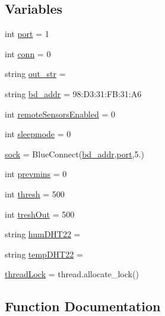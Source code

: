 \subsection*{Variables}
\begin{DoxyCompactItemize}
\item 
int \hyperlink{namespaceSensorNode0_a98a0834cf9ffb42aadb98db46f82cac4}{port} = 1
\item 
int \hyperlink{namespaceSensorNode0_aa58109ec652b3ad7ee90acb844a55e0f}{conn} = 0
\item 
string \hyperlink{namespaceSensorNode0_acbfb5ad644195e6858adb96b932aa531}{out\+\_\+str} = \textquotesingle{}\textquotesingle{}
\item 
string \hyperlink{namespaceSensorNode0_a6bda8d693f223a3426dcc68bdb060e29}{bd\+\_\+addr} = \textquotesingle{}98\+:D3\+:31\+:\+F\+B\+:31\+:\+A6\textquotesingle{}
\item 
int \hyperlink{namespaceSensorNode0_ad2115f513c00e2649307834bfead90af}{remote\+Sensors\+Enabled} = 0
\item 
int \hyperlink{namespaceSensorNode0_a97a9f44b071f562041483214e2bccb90}{sleepmode} = 0
\item 
\hyperlink{namespaceSensorNode0_a6b4baa40941946967bba9f0a8b1d414b}{sock} = Blue\+Connect(\hyperlink{namespaceSensorNode0_a6bda8d693f223a3426dcc68bdb060e29}{bd\+\_\+addr},\hyperlink{namespaceSensorNode0_a98a0834cf9ffb42aadb98db46f82cac4}{port},5.)
\item 
int \hyperlink{namespaceSensorNode0_a6cd829500b35c8860adb0de438f8ac86}{prevmins} = 0
\item 
int \hyperlink{namespaceSensorNode0_affd806dd0b5faa586b60d239832a60b3}{thresh} = 500
\item 
int \hyperlink{namespaceSensorNode0_a8b1d695d3a341a34667a220af9c25ce4}{tresh\+Out} = 500
\item 
string \hyperlink{namespaceSensorNode0_af0fa9a4e63f52876e95004704156b614}{hum\+D\+H\+T22} = \textquotesingle{}\textquotesingle{}
\item 
string \hyperlink{namespaceSensorNode0_ae6cff13e6146160841c5249c19e8e8c7}{temp\+D\+H\+T22} = \textquotesingle{}\textquotesingle{}
\item 
\hyperlink{namespaceSensorNode0_ac28b0dfb61cb44c2075c9f10cc918c72}{thread\+Lock} = thread.\+allocate\+\_\+lock()
\end{DoxyCompactItemize}


\subsection{Function Documentation}

